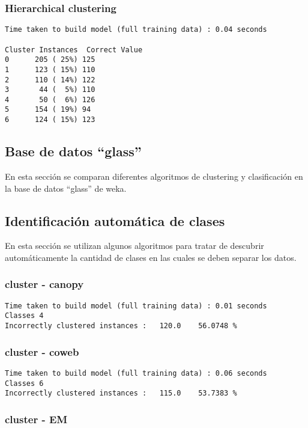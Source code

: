 \documentclass[a4paper]{article}
\begin{document}
\subsubsection{Hierarchical clustering}

\begin{verbatim}
Time taken to build model (full training data) : 0.04 seconds

Cluster Instances  Correct Value
0      205 ( 25%) 125
1      123 ( 15%) 110
2      110 ( 14%) 122
3       44 (  5%) 110
4       50 (  6%) 126
5      154 ( 19%) 94
6      124 ( 15%) 123

\end{verbatim}

\subsection{Base de datos ``glass''}

En esta sección se comparan diferentes algoritmos de clustering
y clasificación en la base de datos ``glass'' de weka.

\subsection{Identificación automática de clases}

En esta sección se utilizan algunos algoritmos para tratar de
descubrir automáticamente la cantidad de clases en las cuales
se deben separar los datos.

\subsubsection{cluster - canopy}

\begin{verbatim}
Time taken to build model (full training data) : 0.01 seconds
Classes 4
Incorrectly clustered instances :	120.0	 56.0748 %
\end{verbatim}

\subsubsection{cluster - coweb}

\begin{verbatim}
Time taken to build model (full training data) : 0.06 seconds
Classes 6
Incorrectly clustered instances :	115.0	 53.7383 %
\end{verbatim}

\subsubsection{cluster - EM}
\end{document}
